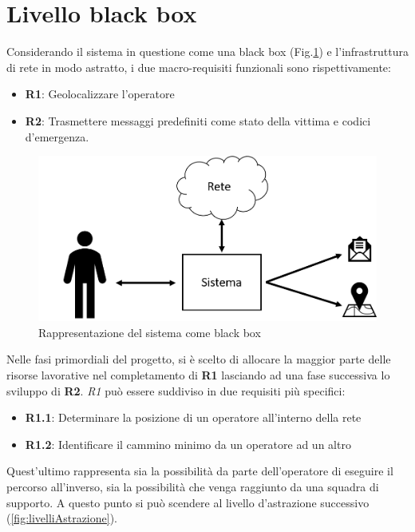 \section{Livello black box}
Considerando il sistema in questione come una black box (Fig.\ref{fig:requisitiFunzionali}) e l'infrastruttura di rete in modo astratto, i due macro-requisiti funzionali  sono rispettivamente:
\begin{itemize}
	\item \textbf{R1}: Geolocalizzare l'operatore
	\item \textbf{R2}: Trasmettere messaggi predefiniti come stato della vittima e codici d'emergenza.
\end{itemize}
\begin{figure}[H]
	\centering
	\includegraphics[scale=0.3]{DescrizioneDelSistema/requisitiSistema.png}
	\caption{Rappresentazione del sistema come black box }
	\label{fig:requisitiFunzionali}
\end{figure}
Nelle fasi primordiali del progetto, si è scelto di allocare la maggior parte delle risorse lavorative nel completamento di \textbf{R1} lasciando ad una fase successiva lo sviluppo di \textbf{R2}. \textit{R1} può essere suddiviso in due requisiti più specifici:
\begin{itemize}
	\item \textbf{R1.1}: Determinare la posizione di un operatore all'interno della rete
	\item \textbf{R1.2}: Identificare il cammino minimo da un operatore ad un altro
\end{itemize}
Quest'ultimo rappresenta sia la possibilità da parte dell'operatore di eseguire il percorso all'inverso, sia la possibilità che venga raggiunto da una squadra di supporto. A questo punto si può scendere al livello d'astrazione successivo (\ref{fig:livelliAstrazione}).
\newpage 


